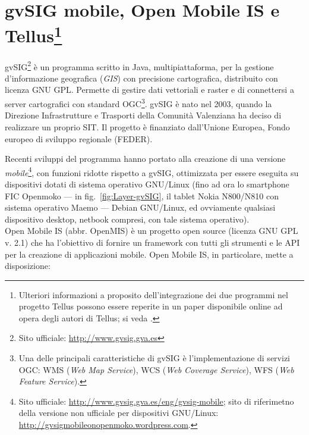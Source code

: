 \documentclass{paper}
\begin{document}
\section[gvSIG mobile, OpenMobile IS e Tellus]{gvSIG mobile, Open Mobile IS e Tellus\footnote{Ulteriori informazioni a proposito dell'integrazione dei due programmi
nel progetto Tellus possono essere reperite in un paper disponibile online ad opera degli autori di Tellus; si veda \cite{tellusarticle}.}}

	gvSIG\footnote{Sito ufficiale: \href{http://www.gvsig.gva.es}{http://www.gvsig.gva.es}} \`{e} un programma scritto in Java, multipiattaforma, per la gestione
	d'informazione geografica (\emph{GIS}) con precisione cartografica,
	distribuito con licenza GNU GPL. Permette di gestire dati vettoriali
	e raster e di connettersi a server cartografici con standard OGC\footnote{Una delle principali caratteristiche di gvSIG è l'implementazione
	di servizi OGC: WMS (\emph{Web Map Service}), WCS (\emph{Web Coverage
	Service}), WFS (\emph{Web Feature Service}).}. gvSIG \`{e} nato nel 2003, quando la Direzione Infrastrutture e Trasporti
	della Comunità Valenziana ha deciso di realizzare un proprio SIT.
	Il progetto \`{e} finanziato dall'Unione Europea, Fondo europeo di sviluppo
	regionale (FEDER).

	Recenti sviluppi del programma hanno portato alla creazione di una
	versione \emph{mobile}\footnote{Sito ufficiale: \href{http://www.gvsig.gva.es/eng/gvsig-mobile}{http://www.gvsig.gva.es/eng/gvsig-mobile};
	sito di riferimetno della versione non ufficiale per dispositivi GNU/Linux:
	\href{http://gvsigmobileonopenmoko.wordpress.com}{http://gvsigmobileonopenmoko.wordpress.com}.}, con funzioni ridotte rispetto a gvSIG, ottimizzata per essere eseguita
	su dispositivi dotati di sistema operativo GNU/Linux (fino ad ora
	lo smartphone FIC Openmoko --- in fig.~\ref{fig:Layer-gvSIG}, il
	tablet Nokia N800/N810 con sistema operativo Maemo --- Debian GNU/Linux,
	ed ovviamente qualsiasi dispositivo desktop, netbook compresi, con
	tale sistema operativo).\\


	Open Mobile IS (abbr. OpenMIS) \`{e} un progetto open source (licenza
	GNU GPL v. 2.1) che ha l'obiettivo di fornire un framework con tutti
	gli strumenti e le API per la creazione di applicazioni mobile. Open
	Mobile IS, in particolare, mette a disposizione:
\end{document}
